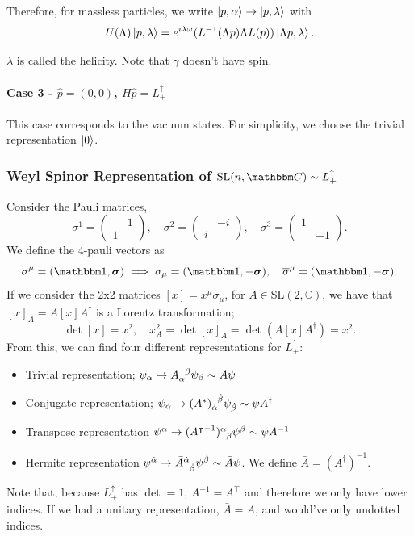 \documentclass{article}
\begin{document}
Therefore, for massless particles, we write $\ket{p,\alpha}\to\ket{p,\lambda}$ with 
$$U(\Lambda)\ket{p,\lambda}=e^{i\lambda\omega}(L^{-1}(\Lambda p)\Lambda L(p))\ket{\Lambda p,\lambda}.$$

$\lambda$ is called the helicity. Note that $\gamma$ doesn't have spin.

\paragraph{Case 3 - $\hat p=(0,0)$, $H\hat p=L^\uparrow_+$}

This case corresponds to the vacuum states. For simplicity, we choose the trivial representation $\ket 0$.

\subsubsection{Weyl Spinor Representation of $\mathrm{SL}(n,\mathbbm C)\sim L^\uparrow_+$}

Consider the Pauli matrices,
$$\sigma^1=\begin{pmatrix}&1\\1&\end{pmatrix},\quad\sigma^2=\begin{pmatrix}&-i\\i&\end{pmatrix},\quad\sigma^3=\begin{pmatrix}1&\\&-1\end{pmatrix}.$$
We define the 4-pauli vectors as 
$$\sigma^\mu=(\mathbbm 1,\boldsymbol\sigma)\implies\sigma_\mu=(\mathbbm 1,-\boldsymbol\sigma),\quad\overline\sigma^\mu=(\mathbbm 1,-\boldsymbol\sigma).$$
If we consider the 2x2 matrices $[x]=x^\mu\sigma_\mu$, for $A\in\mathrm{SL}(2,\mathbb C)$, we have that $[x]_A=A[x]A^\dag$ is a Lorentz transformation; 
$$\det[x]=x^2,\quad x^2_A=\det[x]_A=\det(A[x]A^\dag)=x^2.$$
From this, we can find four different representations for $L^\uparrow_+$:
\begin{itemize}
    \item Trivial representation; $\psi_\alpha\to A\indices{_\alpha^\beta}\psi_\beta\sim A\psi$
    \item Conjugate representation; $\psi_{\dot\alpha}\to(A^*)\indices{_{\dot\alpha}^{\dot\beta}}\psi_{\dot\beta}\sim \psi A^\dag$
    \item Transpose representation $\psi^\alpha\to ({A^\intercal}^{-1})\indices{^\alpha_\beta}\psi^\beta\sim\psi A^{-1}$
    \item Hermite representation $\psi^{\dot\alpha}\to\bar A\indices{^{\dot\alpha}_{\dot\beta}}\psi^{\dot\beta}\sim\bar A\psi$. We define $\bar A=(A^\dag)^{-1}$.
\end{itemize}
Note that, because $L^\uparrow_+$ has $\det=1$, $A^{-1}=A^\intercal$ and therefore we only have lower indices. If we had a unitary representation, $\bar A=A$, and would've only undotted indices.
\end{document}
